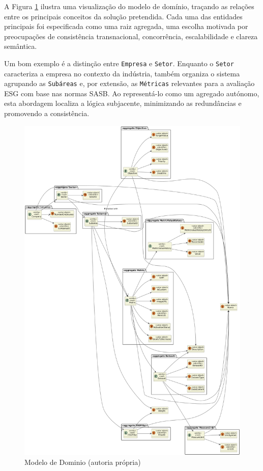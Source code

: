 A Figura \ref{fig:domain_model} ilustra uma visualização do modelo de domínio, traçando as relações entre os principais conceitos da solução pretendida. Cada uma das entidades principais foi especificada como uma raiz agregada, uma escolha motivada por preocupações de consistência transnacional, concorrência, escalabilidade e clareza semântica.

Um bom exemplo é a distinção entre \texttt{Empresa} e \texttt{Setor}. Enquanto o \texttt{Setor} caracteriza a empresa no contexto da indústria, também organiza o sistema agrupando as \texttt{Subáreas} e, por extensão, as \texttt{Métricas} relevantes para a avaliação ESG com base nas normas SASB. Ao representá-lo como um agregado autónomo, esta abordagem localiza a lógica subjacente, minimizando as redundâncias e promovendo a consistência.

\begin{figure}[H]
\centering
    \includegraphics[width=\linewidth,keepaspectratio]{frontmatter/assets/diagrams/Domain Model/Domain_Model2.png}
    \caption{Modelo de Dominio (autoria própria)}
    \label{fig:domain_model}
\end{figure}


